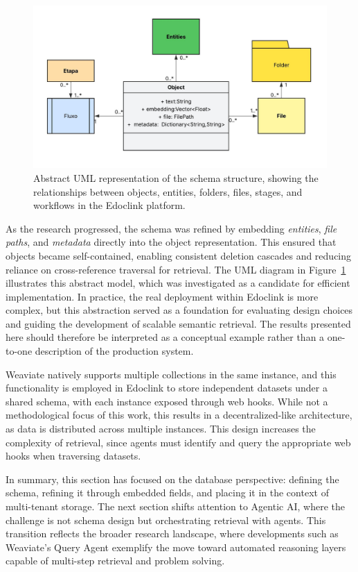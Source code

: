 \begin{figure}[h!]
    \centering
    \includegraphics[width=1\linewidth]{Images/Classe UML.jpeg}
    \caption{Abstract UML representation of the schema structure, showing the relationships between objects, entities, folders, files, stages, and workflows in the Edoclink platform.}
    \label{fig:weaviate_class}
\end{figure}

As the research progressed, the schema was refined by embedding \textit{entities}, \textit{file paths}, and \textit{metadata} directly into the object representation. This ensured that objects became self-contained, enabling consistent deletion cascades and reducing reliance on cross-reference traversal for retrieval. The UML diagram in Figure~\ref{fig:weaviate_class} illustrates this abstract model, which was investigated as a candidate for efficient implementation. In practice, the real deployment within Edoclink is more complex, but this abstraction served as a foundation for evaluating design choices and guiding the development of scalable semantic retrieval. The results presented here should therefore be interpreted as a conceptual example rather than a one-to-one description of the production system.

Weaviate natively supports multiple collections in the same instance, and this functionality is employed in Edoclink to store independent datasets under a shared schema, with each instance exposed through web hooks. While not a methodological focus of this work, this results in a decentralized-like architecture, as data is distributed across multiple instances. This design increases the complexity of retrieval, since agents must identify and query the appropriate web hooks when traversing datasets.  

In summary, this section has focused on the database perspective: defining the schema, refining it through embedded fields, and placing it in the context of multi-tenant storage. The next section shifts attention to Agentic AI, where the challenge is not schema design but orchestrating retrieval with agents. This transition reflects the broader research landscape, where developments such as Weaviate’s Query Agent \cite{weaviate} exemplify the move toward automated reasoning layers capable of multi-step retrieval and problem solving.

